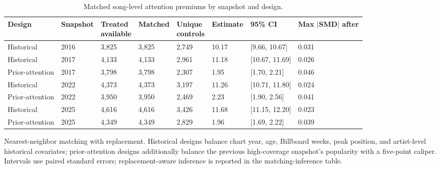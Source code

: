 \begin{table}[!htbp]
\centering
\footnotesize
\caption{Matched song-level attention premiums by snapshot and design.}
\label{tab:si-song-matching-estimates}
\renewcommand{\arraystretch}{1.05}
\begin{tabular}{llllllll}
\toprule
Design & Snapshot & \makecell[b]{Treated\\ available} & Matched & \makecell[b]{Unique\\ controls} & Estimate & 95\% CI & \makecell[b]{Max\\ $|$SMD$|$\\ after} \\
\midrule
Historical & 2016 & 3,825 & 3,825 & 2,749 & 10.17 & [9.66, 10.67] & 0.031 \\
Historical & 2017 & 4,133 & 4,133 & 2,961 & 11.18 & [10.67, 11.69] & 0.026 \\
Prior-attention & 2017 & 3,798 & 3,798 & 2,307 & 1.95 & [1.70, 2.21] & 0.046 \\
Historical & 2022 & 4,373 & 4,373 & 3,197 & 11.26 & [10.71, 11.80] & 0.024 \\
Prior-attention & 2022 & 3,950 & 3,950 & 2,469 & 2.23 & [1.90, 2.56] & 0.041 \\
Historical & 2025 & 4,616 & 4,616 & 3,426 & 11.68 & [11.15, 12.20] & 0.023 \\
Prior-attention & 2025 & 4,349 & 4,349 & 2,829 & 1.96 & [1.69, 2.22] & 0.039 \\
\bottomrule
\end{tabular}
\begin{flushleft}\footnotesize
Nearest-neighbor matching with replacement. Historical designs balance chart year, age, Billboard weeks, peak position, and artist-level historical covariates; prior-attention designs additionally balance the previous high-coverage snapshot's popularity with a five-point caliper. Intervals use paired standard errors; replacement-aware inference is reported in the matching-inference table.
\end{flushleft}
\end{table}
